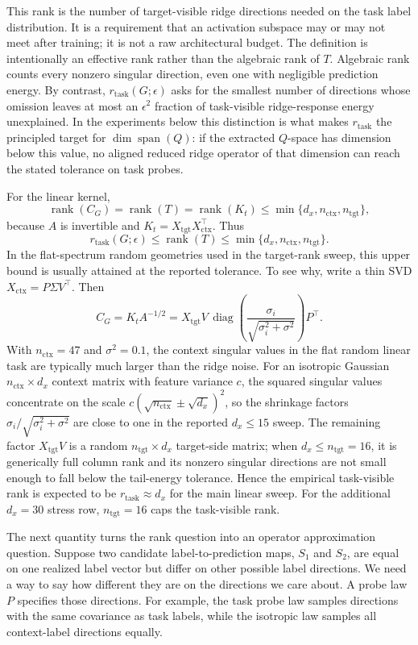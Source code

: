 \documentclass[11pt]{article}
\newcommand{\rank}{\operatorname{rank}}
\newcommand{\spanop}{\operatorname{span}}
\begin{document}
This rank is the number of target-visible ridge directions needed on the task label distribution.
It is a requirement that an activation subspace may or may not meet after training; it is not a raw
architectural budget. The definition is intentionally an effective rank rather than the algebraic
rank of \(T\). Algebraic rank counts every nonzero singular direction, even one with negligible
prediction energy. By contrast, \(r_{\mathrm{task}}(G;\epsilon)\) asks for the smallest number of
directions whose omission leaves at most an \(\epsilon^2\) fraction of task-visible ridge-response
energy unexplained. In the experiments below this distinction is what makes \(r_{\mathrm{task}}\) the
principled target for \(\dim\spanop(Q)\): if the extracted \(Q\)-space has dimension below this value,
no aligned reduced ridge operator of that dimension can reach the stated tolerance on task probes.

For the linear kernel,
\[
\rank(C_G)=\rank(T)=\rank(K_t)\le \min\{d_x,n_{\mathrm{ctx}},n_{\mathrm{tgt}}\},
\]
because \(A\) is invertible and \(K_t=X_{\mathrm{tgt}}X_{\mathrm{ctx}}^\top\). Thus
\[
r_{\mathrm{task}}(G;\epsilon)\le \rank(T)\le \min\{d_x,n_{\mathrm{ctx}},n_{\mathrm{tgt}}\}.
\]
In the flat-spectrum random geometries used in the target-rank sweep, this upper bound is usually
attained at the reported tolerance. To see why, write a thin SVD
\(X_{\mathrm{ctx}}=P\Sigma V^\top\). Then
\[
C_G
=K_tA^{-1/2}
=X_{\mathrm{tgt}}V\,
\operatorname{diag}\!\left(\frac{\sigma_i}{\sqrt{\sigma_i^2+\sigma^2}}\right)P^\top .
\]
With \(n_{\mathrm{ctx}}=47\) and \(\sigma^2=0.1\), the context singular values in the flat random
linear task are typically much larger than the ridge noise. For an isotropic Gaussian
\(n_{\mathrm{ctx}}\times d_x\) context matrix with feature variance \(c\), the squared singular values
concentrate on the scale \(c(\sqrt{n_{\mathrm{ctx}}}\pm\sqrt{d_x})^2\), so the shrinkage factors
\(\sigma_i/\sqrt{\sigma_i^2+\sigma^2}\) are close to one in the reported \(d_x\le15\) sweep.
The remaining factor \(X_{\mathrm{tgt}}V\) is a random \(n_{\mathrm{tgt}}\times d_x\) target-side matrix;
when \(d_x\le n_{\mathrm{tgt}}=16\), it is generically full column rank and its nonzero singular
directions are not small enough to fall below the tail-energy tolerance. Hence the empirical
task-visible rank is expected to be \(r_{\mathrm{task}}\approx d_x\) for the main linear sweep.
For the additional \(d_x=30\) stress row, \(n_{\mathrm{tgt}}=16\) caps the task-visible rank.

The next quantity turns the rank question into an operator approximation question. Suppose
two candidate label-to-prediction maps, \(S_1\) and \(S_2\), are equal on one realized label vector but
differ on other possible label directions. We need a way to say how different they are on the
directions we care about. A probe law \(P\) specifies those directions. For example, the task probe
law samples directions with the same covariance as task labels, while the isotropic law samples all
context-label directions equally.
\end{document}
